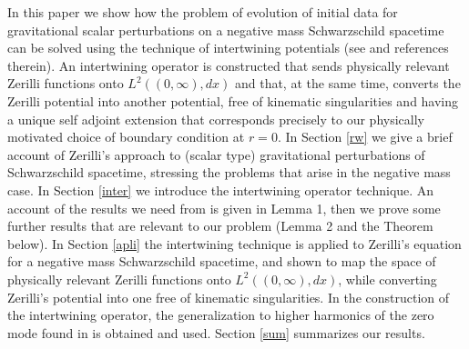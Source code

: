 \documentclass[aps,floats,showpacs,amssymb,tightenlines]{revtex4}
\begin{document}
In this paper we show how the problem of evolution of initial data for gravitational scalar
perturbations on a negative mass Schwarzschild spacetime can be solved using the technique of intertwining potentials
 (see \cite{price} and references therein).
An intertwining operator is constructed that sends physically relevant Zerilli functions onto $L^2((0,\infty),dx)$ and that,
at the same time, converts the Zerilli potential into another potential, free of kinematic singularities and having a unique
self adjoint extension that corresponds precisely to our physically motivated choice of boundary condition at $r=0$.
In Section \ref{rw} we give a brief account of Zerilli's approach to (scalar type) gravitational
perturbations of Schwarzschild spacetime,
stressing the problems that arise
 in the negative mass case. In Section \ref{inter} we
 introduce the intertwining operator technique. An account of the results we need from
 \cite{price} is given in Lemma 1, then we prove some further
results that are relevant to our problem (Lemma 2 and the Theorem below).
In Section \ref{apli} the intertwining technique is applied to Zerilli's equation for a negative mass
Schwarzschild spacetime, and shown to map the space of physically relevant Zerilli functions onto $L^2((0,\infty),dx)$,
while converting  Zerilli's potential into one free of kinematic singularities. In the  construction of  the
intertwining operator, the generalization to higher harmonics of the zero mode found in \cite{ghi} is obtained and used.
Section \ref{sum} summarizes our results.
\end{document}
